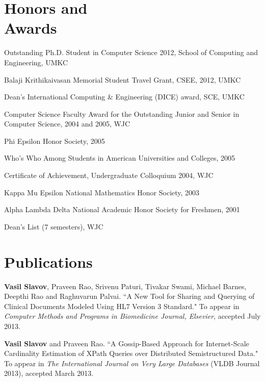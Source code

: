 \documentclass[margin,line]{resume}
\begin{document}
\begin{resume}
    \section{\mysidestyle Honors and\\Awards} 
    \begin{list2}
    \item Outstanding Ph.D. Student in Computer Science 2012, School of Computing and Engineering, UMKC
    \item Balaji Krithikaivasan Memorial Student Travel Grant, CSEE, 2012, UMKC
    \item Dean's International Computing \& Engineering (DICE) award, SCE, UMKC
    \item Computer Science Faculty Award for the Outstanding Junior and Senior in Computer Science, 2004 and 2005, WJC
    \item Phi Epsilon Honor Society, 2005
    \item Who's Who Among Students in American Universities and Colleges, 2005
    \item Certificate of Achievement, Undergraduate Colloquium 2004, WJC
    \item Kappa Mu Epsilon National Mathematics Honor Society, 2003
    \item Alpha Lambda Delta National Academic Honor Society for Freshmen, 2001
    \item Dean's List (7 semesters), WJC
    \end{list2}

    \section{\mysidestyle Publications}

    \textbf{Vasil Slavov}, Praveen Rao, Srivenu Paturi, Tivakar Swami, Michael Barnes, Deepthi Rao and Raghuvarun Palvai.
    ``A New Tool for Sharing and Querying of Clinical Documents Modeled Using HL7 Version 3 Standard."
    To appear in \textsl{Computer Methods and Programs in Biomedicine Journal, Elsevier}, accepted July 2013.

   \vspace{-2mm}
    \textbf{Vasil Slavov} and Praveen Rao.
    ``A Gossip-Based Approach for Internet-Scale Cardinality Estimation of XPath Queries over Distributed Semistructured Data."
    To appear in \textsl{The International Journal on Very Large Databases} (VLDB Journal 2013), accepted March 2013.


\end{resume}
\end{document}
